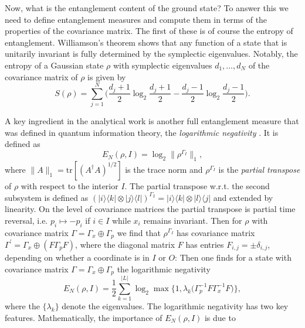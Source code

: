 \documentclass[rmp,twocolumn,floatfix,epsfig,graphics]{revtex4} %
\begin{document}
Now, what is the entanglement content of the ground state? To
answer this we need to define entanglement measures and compute 
them in terms of the properties of the covariance matrix. The first 
of these is of course the entropy of entanglement.
Williamson's theorem shows that any function of a state that is 
unitarily invariant is fully determined by the symplectic 
eigenvalues. Notably, the entropy of a Gaussian state $\rho$ 
with symplectic eigenvalues $d_1,\dots, d_N$ of the covariance matrix of $\rho$ is given by
\begin{equation*}
        S(\rho) =\sum_{j=1}^N \biggl(
        \frac{d_j+1}{2} \log_2 \frac{d_j+1}{2}
        - 
        \frac{d_j-1}{2}\log_2\frac{d_j-1}{2}
        \biggr).
\end{equation*}

A key ingredient in the analytical work is another full entanglement
measure that was defined in quantum information theory, the 
{\it logarithmic negativity} \cite{PhD,Volume,VidalNegativity,PlenioNegativity,InHouseReview,EisertPlenioneg}.
It is defined as  
\begin{equation*}
        E_{N}(\rho,I) = \log_2 \|\rho^{\Gamma_I}\|_1,
\end{equation*}
where $\|A\|_1=\text{tr}[(A^\dagger A)^{1/2}]$ is the trace norm
and $\rho^{\Gamma_I}$ is the {\it partial transpose} of $\rho$ with 
respect to the interior $I$. The partial transpose w.r.t. the 
second subsystem is defined as 
$(|i\rangle \langle k|\otimes|j\rangle \langle l|)^{\Gamma_2}=
|i\rangle \langle k|\otimes|l\rangle \langle j|$ and extended by linearity.
On the level of covariance matrices the partial transpose is 
partial time reversal, i.e. $p_i\mapsto -p_i$ if $i\in I$ while 
$x_i$ remains invariant. Then for $\rho$ with covariance matrix 
$\Gamma=\Gamma_x\oplus\Gamma_p$ we find that $\rho^{\Gamma_{I}}$ 
has covariance matrix $\Gamma^\prime = \Gamma_x\oplus 
(F\Gamma_pF)$, where the diagonal matrix 
$F$ has entries $F_{i,j}=\pm \delta_{i,j}$, depending on whether a coordinate is in 
$I$ or $O$:
Then one finds for a state with covariance matrix $\Gamma=\Gamma_x\oplus\Gamma_p$ the logarithmic negativity 
\cite{Harmonic,marcusThesis}
\begin{equation*}
        E_{N}(\rho,I) = \frac{1}{2}\sum_{k=1}^{|L|} \log_2\max \bigl\{1, \lambda_k\bigl(\Gamma_p^{-1}F\Gamma_x^{-1}F\bigr)\bigr\},
\end{equation*}
where the $\{\lambda_k\}$ denote the eigenvalues.
The logarithmic negativity has two key features. Mathematically, 
the importance of $E_{N}(\rho,I)$ is due to 
\end{document}
